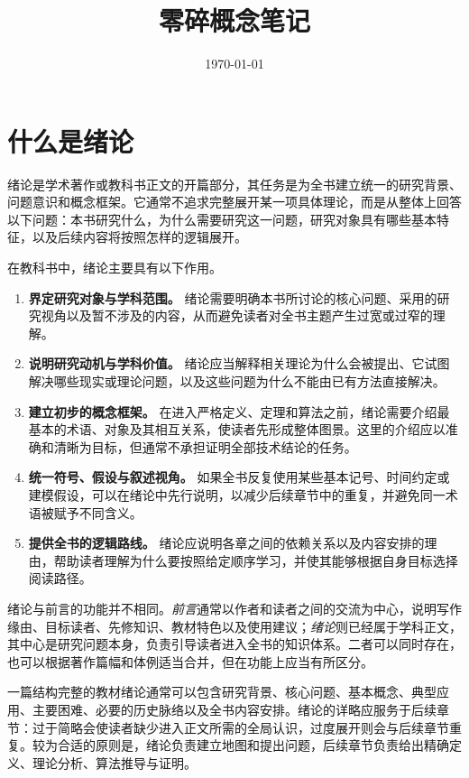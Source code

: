 \documentclass[UTF8,12pt,a4paper,fontset=fandol]{ctexbook}
\title{零碎概念笔记}
\author{}
\date{\today}
\begin{document}
\frontmatter %


\maketitle
\tableofcontents
\clearpage


\mainmatter

\chapter{什么是绪论}


绪论是学术著作或教科书正文的开篇部分，其任务是为全书建立统一的研究背景、问题意识和概念框架。它通常不追求完整展开某一项具体理论，而是从整体上回答以下问题：本书研究什么，为什么需要研究这一问题，研究对象具有哪些基本特征，以及后续内容将按照怎样的逻辑展开。


在教科书中，绪论主要具有以下作用。


\begin{enumerate}
  \item \textbf{界定研究对象与学科范围。}
  绪论需要明确本书所讨论的核心问题、采用的研究视角以及暂不涉及的内容，从而避免读者对全书主题产生过宽或过窄的理解。


  \item \textbf{说明研究动机与学科价值。}
  绪论应当解释相关理论为什么会被提出、它试图解决哪些现实或理论问题，以及这些问题为什么不能由已有方法直接解决。


  \item \textbf{建立初步的概念框架。}
  在进入严格定义、定理和算法之前，绪论需要介绍最基本的术语、对象及其相互关系，使读者先形成整体图景。这里的介绍应以准确和清晰为目标，但通常不承担证明全部技术结论的任务。


  \item \textbf{统一符号、假设与叙述视角。}
  如果全书反复使用某些基本记号、时间约定或建模假设，可以在绪论中先行说明，以减少后续章节中的重复，并避免同一术语被赋予不同含义。


  \item \textbf{提供全书的逻辑路线。}
  绪论应说明各章之间的依赖关系以及内容安排的理由，帮助读者理解为什么要按照给定顺序学习，并使其能够根据自身目标选择阅读路径。
\end{enumerate}


绪论与前言的功能并不相同。\emph{前言}通常以作者和读者之间的交流为中心，说明写作缘由、目标读者、先修知识、教材特色以及使用建议；\emph{绪论}则已经属于学科正文，其中心是研究问题本身，负责引导读者进入全书的知识体系。二者可以同时存在，也可以根据著作篇幅和体例适当合并，但在功能上应当有所区分。


一篇结构完整的教材绪论通常可以包含研究背景、核心问题、基本概念、典型应用、主要困难、必要的历史脉络以及全书内容安排。绪论的详略应服务于后续章节：过于简略会使读者缺少进入正文所需的全局认识，过度展开则会与后续章节重复。较为合适的原则是，绪论负责建立地图和提出问题，后续章节负责给出精确定义、理论分析、算法推导与证明。
\end{document}
